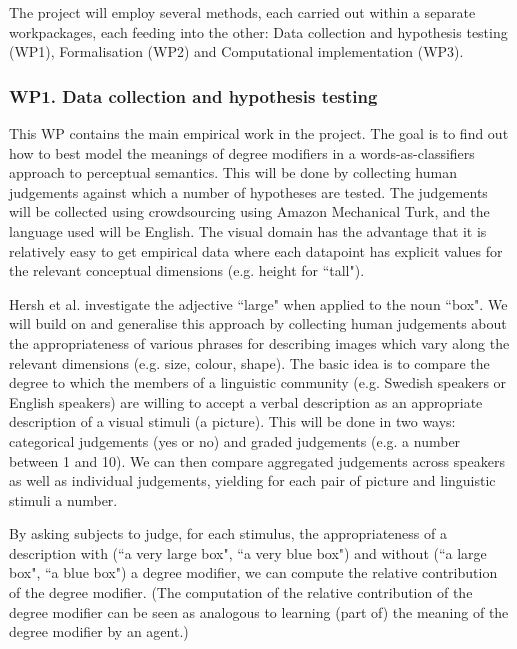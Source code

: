 \documentclass[11pt,a4paper]{article}
\newcommand{\people}[1]{}
\begin{document}





The project will employ several methods, each carried out within a separate workpackages, each feeding into the other:  Data collection and hypothesis testing (WP1), Formalisation (WP2) and  Computational implementation  (WP3).





\subsubsection*{WP1. Data collection and hypothesis testing} 

\people{chris, staffan, (stergios), simon?}

This WP contains the main empirical work in the project. The goal is to find out how to best model the meanings of degree modifiers in a words-as-classifiers approach to perceptual semantics. This will be done by collecting human judgements against which a number of hypotheses are tested. The judgements will be collected using crowdsourcing using Amazon Mechanical Turk, and the language used will be English. The visual domain has the advantage that it is relatively easy to get empirical data where each datapoint has explicit values for the relevant conceptual  dimensions (e.g. height for ``tall").

Hersh et al. \citeyear{hersh1976fuzzy}\/  investigate the adjective ``large" when applied to the noun ``box". We will build on and generalise this approach by collecting human judgements about the appropriateness of various phrases for describing images which vary along the relevant dimensions (e.g. size, colour, shape). 
The basic idea is to compare the degree to which the members of a linguistic community (e.g. Swedish speakers or English speakers) are willing to accept a verbal description as an appropriate description of a visual stimuli (a picture). This will be done in two ways: categorical judgements (yes or no) and graded judgements (e.g. a number between 1 and 10). We can then compare aggregated judgements across speakers as well as individual judgements, yielding for each pair of picture and linguistic  stimuli a number.

By asking subjects to judge, for each stimulus, the appropriateness of a description with (``a very large box", ``a very blue box") and without (``a large box", ``a blue box") a degree modifier, we can compute the relative contribution of the degree modifier. (The computation of the relative contribution of the degree modifier can be seen as analogous to learning (part of) the meaning of the degree modifier by an agent.) 
\end{document}
